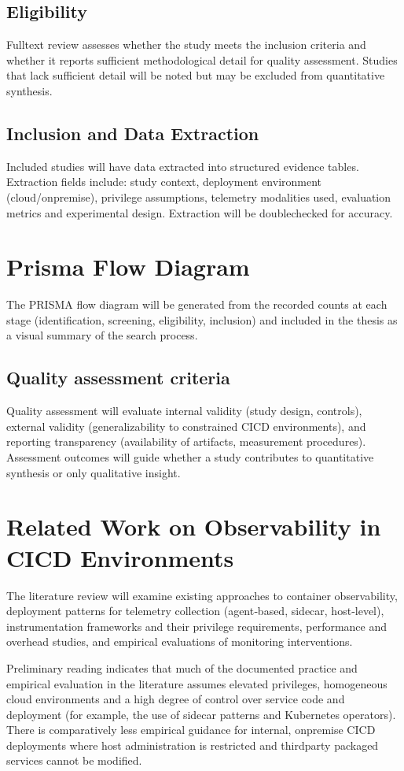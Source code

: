 \subsection{Eligibility}
Full\-text review assesses whether the study meets the inclusion criteria and whether it reports sufficient methodological detail for quality assessment. Studies that lack sufficient detail will be noted but may be excluded from quantitative synthesis.

\subsection{Inclusion and Data Extraction}
Included studies will have data extracted into structured evidence tables. Extraction fields include: study context, deployment environment (cloud/on\-premise), privilege assumptions, telemetry modalities used, evaluation metrics and experimental design. Extraction will be double\-checked for accuracy.
\section{Prisma Flow Diagram}
The PRISMA flow diagram will be generated from the recorded counts at each stage (identification, screening, eligibility, inclusion) and included in the thesis as a visual summary of the search process.

\subsection{Quality assessment criteria}
Quality assessment will evaluate internal validity (study design, controls), external validity (generalizability to constrained \ac{CICD} environments), and reporting transparency (availability of artifacts, measurement procedures). Assessment outcomes will guide whether a study contributes to quantitative synthesis or only qualitative insight.
\section{Related Work on Observability in CICD Environments}

The literature review will examine existing approaches to container observability, deployment patterns for telemetry collection (agent‑based, sidecar, host‑level), instrumentation frameworks and their privilege requirements, performance and overhead studies, and empirical evaluations of monitoring interventions.

Preliminary reading indicates that much of the documented practice and empirical evaluation in the literature assumes elevated privileges, homogeneous cloud environments and a high degree of control over service code and deployment (for example, the use of sidecar patterns and Kubernetes operators). There is comparatively less empirical guidance for internal, on\-premise \ac{CICD} deployments where host administration is restricted and third\-party packaged services cannot be modified.

